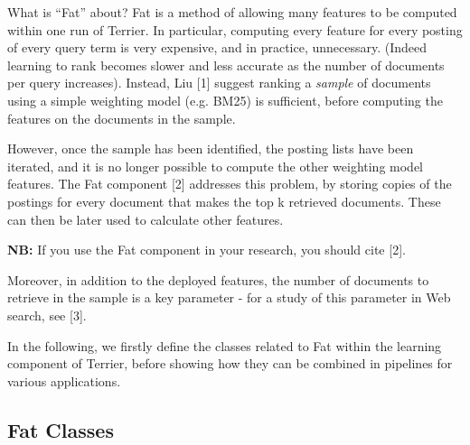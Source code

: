 What is ``Fat'' about? Fat is a method of allowing many features to be
computed within one run of Terrier. In particular, computing every
feature for every posting of every query term is very expensive, and in
practice, unnecessary. (Indeed learning to rank becomes slower and less
accurate as the number of documents per query increases). Instead, Liu
{[}1{]} suggest ranking a \emph{sample} of documents using a simple
weighting model (e.g. BM25) is sufficient, before computing the features
on the documents in the sample.

However, once the sample has been identified, the posting lists have
been iterated, and it is no longer possible to compute the other
weighting model features. The Fat component {[}2{]} addresses this
problem, by storing copies of the postings for every document that makes
the top k retrieved documents. These can then be later used to calculate
other features.

\textbf{NB:} If you use the Fat component in your research, you should
cite {[}2{]}.

Moreover, in addition to the deployed features, the number of documents
to retrieve in the sample is a key parameter - for a study of this
parameter in Web search, see {[}3{]}.

In the following, we firstly define the classes related to Fat within
the learning component of Terrier, before showing how they can be
combined in pipelines for various applications.

\subsection{Fat Classes}\label{fat-classes}

